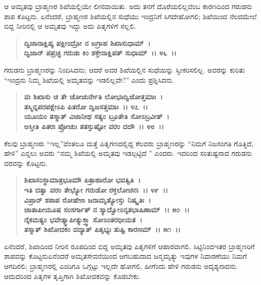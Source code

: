 ಆ ಅಮೃತವು ಬ್ರಾಹ್ಮಣರ ಶಿಖೆಯಲ್ಲಿಯೇ ಲೀನವಾಯಿತು. ಅದು ತನಗೆ ದೊರೆಯಲಿಲ್ಲವೆಂಬ ಕಾರಣದಿಂದ ಗರುಡನು ಶಾಪ ಕೊಟ್ಟನು. ಏನೆಂದರೆ, ಬ್ರಾಹ್ಮಣರ ಶಿಖೆಯಲ್ಲಿನ ಸುಧೆಯು ಇಂದ್ರನಿಗೆ ಸಿಗದೇಹೋಗಲಿ; ಶಿಖೆಯಿಂದ ನೆಲದಮೇಲೆ ಬಿದ್ದ ನೀರಿನಲ್ಲಿ ಆ ಅಮೃತವು ಇದ್ದು ಅದು ಪಿತೃಗಳಿಗೆ ಸಲ್ಲಲಿ.

\begin{verse}
\textbf{ದ್ವಿಜಾನಾಕ್ಷಿಪ್ಯ ಪಕ್ಷೀಂದ್ರೋ ನ ಜಗ್ರಾಹ ಶಿಖಾಸುಧಾಮ್~।}\\\textbf{ದ್ವಿಜಾನ್ ಪಪ್ರಚ್ಛ ಗರುಡಃ ಕಿಂ ಶಕ್ತೇನಾಕ್ಷಿಪತ್ ಸುಧಾಮ್~।। ೪೬~।।}
\end{verse}

ಗರುಡನು ಬ್ರಾಹ್ಮಣರನ್ನು ನಿಂದಿಸಿದನು; ಆದರೆ ಅವರ ಶಿಖೆಯಲ್ಲಿನ ಸುಧೆಯನ್ನು ಸ್ವೀಕರಿಸಲಿಲ್ಲ. ಅವರನ್ನು ಕುರಿತು “ಇಂದ್ರನು ನಿಮ್ಮ ಶಿಖೆಯಲ್ಲಿ ಅಮೃತವನ್ನು ಇಡಲಿಲ್ಲವೇ?” ಎಂದು ಪ್ರಶ್ನಿಸಿದನು.

\begin{verse}
\textbf{ವಃ ಶಿಖಾಸು ಚ ತೇ ಚೋಚುರ್ನೇತಿ ಲೋಭಾದ್ವಿಜೋತ್ತಮಾಃ~।}\\\textbf{ತಸ್ಮಿನ್ನಪರಪಕ್ಷೇಽಪಿ ಪಿತರೋ ದ್ವಿಜಸತ್ತಮಾಃ~।। ೪೭~।।}\\\textbf{ಯೂಯಂ ತಸ್ಮಾತ್ ವಿಜಾನೀಥ ಸತ್ಯಂ ಬ್ರೂತೇತಿ ಸೋಽಬ್ರವೀತ್~।}\\\textbf{ಅಸ್ತೀತಿ ಪಿತರಃ ಪ್ರೋಚುಃ ತತಸ್ತುಷ್ಟೋ ವರಂ ದದೌ~।। ೪೮~।।}
\end{verse}

ಕೆಲವು ಬ್ರಾಹ್ಮಣರು “ಇಲ್ಲ”ವೆಂತಲೂ ಮತ್ತೆ ಪಿತೃಗಣದಲ್ಲಿದ್ದ ಕೆಲವರು ಬ್ರಾಹ್ಮಣರನ್ನು “ನಿಮಗೆ ನಿಜಸಂಗತಿ ಗೊತ್ತಿದೆ, ಹೇಳಿ” ಎನ್ನಲು ಅವರು “ನಮ್ಮ ಶಿಖೆಯಲ್ಲಿ ಅಮೃತವು ಇಡಲ್ಪಟ್ಟಿದೆ ” ಎಂದರು. ಇದರಿಂದ ಸಂತುಷ್ಟನಾದ ಗರುಡನು ವರವನ್ನು ಕೊಟ್ಟನು.

\begin{verse}
\textbf{ಶಿಖಾಸಂಸ್ಥಾಮಾತ್ರಭೂಮೌ ಪಿತ್ರಾಹಾರೋ ಭವತ್ವಿತಿ~।}\\\textbf{ಇತಿ ದತ್ವಾ ವರಂ ತೇಭ್ಯೋ ಗರುಡೋ ರಕ್ತಲೋಚನಃ~।। ೪೯~।।}\\\textbf{ವಿಪ್ರಾನ್ ಶಶಾಪ ರೋಷೇಣ ಜರಾಮೃತ್ಯೋಸ್ತು ನಿಷ್ಕೃತಿಃ~।}\\\textbf{ಜಾತಾಪೀಯೂಷ ಸಂಸರ್ಗಾತ್ ನ ಸ್ಯಾದ್ವೋಽನೃತಭಾಷಿಣಾಮ್~।। ೫೦~।।}\\\textbf{ನೈಕಮತ್ಯಂ ಭವೇತ್ಕ್ವಾಪೀತ್ಯುಕ್ತ್ವಾ ಸೋಽಂತರಧೀಯತ~।}\\\textbf{ತಸ್ಮಾತ್ ಶಿಖೋದಕಂ ದದ್ಯಾತ್ ಪಿತೃಭ್ಯಃ ತುಷ್ಟಿ ಕಾರಣಮ್~।। ೫೧~।।}
\end{verse}

ಏನೆಂದರೆ, ಶಿಖಾದಿಂದ ನೀರಿನ ರೂಪದಿಂದ ಬಿದ್ದ ಅಮೃತವು ಪಿತೃಗಳಿಗೆ ಆಹಾರ\-ವಾಗಲಿ. ಸಿಟ್ಟಿನಿಂದ\enginline{-}ಇತರ ಬ್ರಾಹ್ಮಣರಿಗೆ ಶಾಪವನ್ನು ಕೊಟ್ಟನು\enginline{-}ಏನೆಂದರೆ ಅಮೃತಸೇವನೆಯಿಂದ ಆಗಬಹುದಾದ ಜನ್ಮ\enginline{-}ಮೃತ್ಯು ಇವುಗಳ ನಿವಾರಣೆಯು ನಿಮಗೆ ಆಗದಿರಲಿ; ಬ್ರಾಹ್ಮಣರಲ್ಲಿ ಎಂದಿಗೂ ಒಗ್ಗಟ್ಟು ಇಲ್ಲದೇ ಹೋಗಲಿ, ಹೀಗೆಂದು ಹೇಳಿ ಗರುಡನು ಅದೃಶ್ಯನಾದನು. ಆದುದರಿಂದ ಪಿತೃಗಳ ತೃಪ್ತಿಗಾಗಿ ಶಿಖೋದಕವನ್ನು ಕೊಡಬೇಕು.

